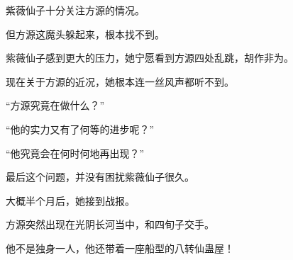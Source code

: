 \begin{this_body}
紫薇仙子十分关注方源的情况。

但方源这魔头躲起来，根本找不到。

紫薇仙子感到更大的压力，她宁愿看到方源四处乱跳，胡作非为。

现在关于方源的近况，她根本连一丝风声都听不到。

“方源究竟在做什么？”

“他的实力又有了何等的进步呢？”

“他究竟会在何时何地再出现？”

最后这个问题，并没有困扰紫薇仙子很久。

大概半个月后，她接到战报。

方源突然出现在光阴长河当中，和四旬子交手。

他不是独身一人，他还带着一座船型的八转仙蛊屋！

\end{this_body}

